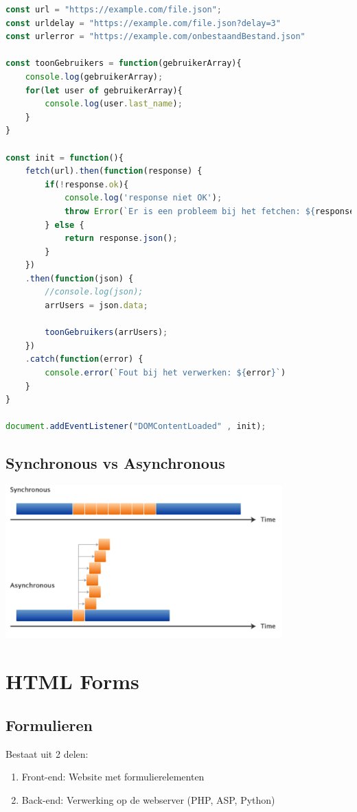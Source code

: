 \documentclass{article}
\begin{document}
\begin{lstlisting}[language=JavaScript]
const url = "https://example.com/file.json";
const urldelay = "https://example.com/file.json?delay=3"
const urlerror = "https://example.com/onbestaandBestand.json"

const toonGebruikers = function(gebruikerArray){
    console.log(gebruikerArray);
    for(let user of gebruikerArray){
        console.log(user.last_name);
    }
}

const init = function(){
    fetch(url).then(function(response) {
        if(!response.ok){
            console.log('response niet OK');
            throw Error(`Er is een probleem bij het fetchen: ${response.status}`);
        } else {
            return response.json();
        }
    })
    .then(function(json) {
        //console.log(json);
        arrUsers = json.data;

        toonGebruikers(arrUsers);
    })
    .catch(function(error) {
        console.error(`Fout bij het verwerken: ${error}`)
    }
}

document.addEventListener("DOMContentLoaded" , init);
\end{lstlisting}

\subsection{Synchronous vs Asynchronous}

\includegraphics[width=0.8\textwidth]{img/Screenshot_20200217_112037.png}


\section{HTML Forms}

\subsection{Formulieren}
Bestaat uit 2 delen:
\begin{enumerate}
    \item Front-end: Website met formulierelementen
    \item Back-end: Verwerking op  de webserver (PHP, ASP, Python)
\end{enumerate}
\end{document}
